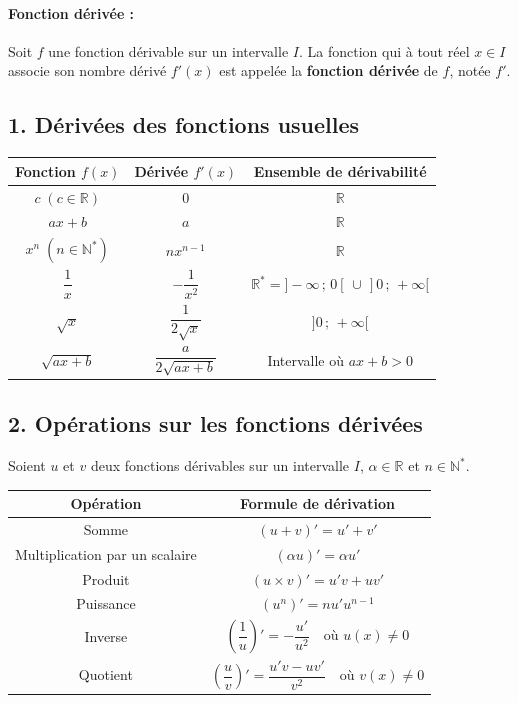 \documentclass[12pt,a4paper]{article}
\begin{document}
\paragraph{Fonction dérivée :}
Soit $f$ une fonction dérivable sur un intervalle $I$. La fonction qui à tout réel $x \in I$ associe son nombre dérivé $f'(x)$ est appelée la \textbf{fonction dérivée} de $f$, notée $f'$.

\subsection*{\color{myred}1. Dérivées des fonctions usuelles}

\begin{center}
\renewcommand{\arraystretch}{1.5}
\begin{tabular}{|c|c|c|}
\hline
\textbf{Fonction } $f(x)$ & \textbf{Dérivée } $f'(x)$ & \textbf{Ensemble de dérivabilité} \\
\hline
$c \; (c \in \mathbb{R})$ & $0$ & $\mathbb{R}$ \\
\hline
$ax + b$ & $a$ & $\mathbb{R}$ \\
\hline
$x^n \; (n \in \mathbb{N}^*)$ & $n x^{n-1}$ & $\mathbb{R}$ \\
\hline
$\dfrac{1}{x}$ & $-\dfrac{1}{x^2}$ & $\mathbb{R}^* = ]-\infty\,;\,0[\, \cup\, ]0\,;\,+\infty[$ \\
\hline
$\sqrt{x}$ & $\dfrac{1}{2\sqrt{x}}$ & $]0 \,;\, +\infty[$ \\
\hline
$\sqrt{ax + b}$ & $\dfrac{a}{2\sqrt{ax + b}}$ & Intervalle où $ax + b > 0$ \\
\hline
\end{tabular}
\end{center}

\subsection*{\color{myred}2. Opérations sur les fonctions dérivées}

Soient $u$ et $v$ deux fonctions dérivables sur un intervalle $I$, $\alpha \in \mathbb{R}$ et $n \in \mathbb{N}^*$.

\begin{center}
\renewcommand{\arraystretch}{1.6}
\begin{tabular}{|c|c|}
\hline
\textbf{Opération} & \textbf{Formule de dérivation} \\
\hline
Somme & $(u + v)' = u' + v'$ \\
\hline
Multiplication par un scalaire & $(\alpha u)' = \alpha u'$ \\
\hline
Produit & $(u \times v)' = u'v + uv'$ \\
\hline
Puissance & $(u^n)' = n u' u^{n-1}$ \\
\hline
Inverse & $\left(\dfrac{1}{u}\right)' = -\dfrac{u'}{u^2} \quad \text{où } u(x) \neq 0$ \\
\hline
Quotient & $\left(\dfrac{u}{v}\right)' = \dfrac{u'v - uv'}{v^2} \quad \text{où } v(x) \neq 0$ \\
\hline
\end{tabular}
\end{center}
\end{document}
